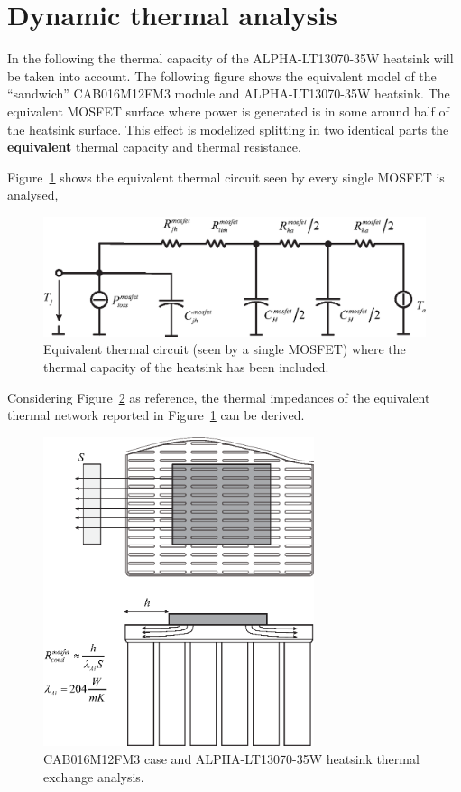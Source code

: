 \documentclass[11pt,a4paper,oneside]{book}
\numberwithin{equation}{section}
\theoremstyle{it}
\theoremstyle{definition}
\begin{document}
\section{Dynamic thermal analysis}
In the following the thermal capacity of the ALPHA-LT13070-35W heatsink will be taken into account. The following figure shows the equivalent model of the “sandwich” CAB016M12FM3 module and ALPHA-LT13070-35W heatsink. The equivalent MOSFET surface where power is generated is in some around half of the heatsink surface. This effect is modelized splitting in two identical parts the \textbf{equivalent} thermal capacity and thermal resistance. 

Figure~\ref{thermal_model_fig_2} shows the equivalent thermal circuit seen by every single MOSFET is analysed,
\begin{figure}[H]
	\centering
	\includegraphics[width = 345pt, angle = 0, 
	keepaspectratio]{figures/thermal_analysis/thermal_model_fig_2.eps}
	\captionsetup{width=0.5\textwidth, font=small}	
	\caption{Equivalent thermal circuit (seen by a single MOSFET) where the thermal capacity of the heatsink has been included.}
	\label{thermal_model_fig_2}
\end{figure}
Considering Figure~\ref{thermal_analysis_1_V} as reference, the thermal impedances of the equivalent thermal network reported in Figure~\ref{thermal_model_fig_2} can be derived.
\begin{figure}[H]
	\centering
	\includegraphics[width = 225pt, angle = 0, 
	keepaspectratio]{figures/thermal_analysis/thermal_analysis_1_V.eps}
	\captionsetup{width=0.5\textwidth, font=small}	
	\caption{CAB016M12FM3 case and ALPHA-LT13070-35W heatsink thermal exchange analysis.}
	\label{thermal_analysis_1_V}
\end{figure}
\end{document}
